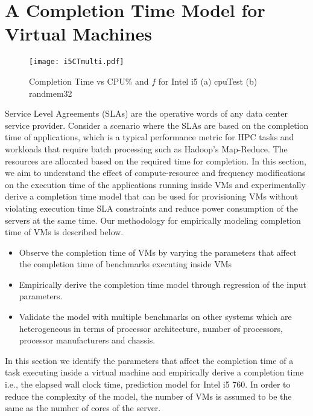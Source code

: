 \documentclass{sig-alternate}
\begin{document}
\section{A Completion Time Model for Virtual Machines}
\label{sec:PfModel}
\begin{figure*}[t]
\vspace{-0.5cm}
\centering
\texttt{[image: i5CTmulti.pdf]}
\caption{Completion Time vs CPU\% and $f$ for Intel i5 (a) cpuTest (b) randmem32}
\label{fig:i5CTmulti}
\vspace{-0.5cm}
\end{figure*}
Service Level Agreements (SLAs) are the operative words of any data center service provider. Consider a scenario where the SLAs are based on the completion time of applications, which is a typical performance metric for HPC tasks and workloads that require batch processing such as Hadoop's Map-Reduce. The resources are allocated based on the required time for completion. In this section, we aim to understand the effect of compute-resource and frequency modifications on the execution time of the applications running inside VMs and experimentally derive a completion time model that can be used for provisioning VMs without violating execution time SLA constraints and reduce power consumption of the servers at the same time. Our methodology for empirically modeling completion time of VMs is described below.
\begin{itemize}
 \item Observe the completion time of VMs by varying the parameters that affect the completion time of benchmarks executing inside VMs
 \item Empirically derive the completion time model through regression of the input parameters.
 \item Validate the model with multiple benchmarks on other systems which are heterogeneous in terms of processor architecture, number of processors, processor manufacturers and chassis. 
\end{itemize}
In this section we identify the parameters that affect the completion time of a task executing inside a virtual machine and empirically derive a completion time i.e., the elapsed wall clock time, prediction model for Intel i5 760. In order to reduce the complexity of the model, the number of VMs is assumed to be the same as the number of cores of the server.
\end{document}
